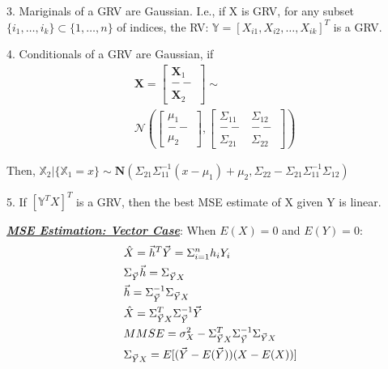 \documentclass[12pt]{article}
\newcommand{\bulletPoint}[1]{\ul{\textit{\textbf{#1}}}}
\begin{document}
\begin{multicols*}{4}
3. Mariginals of a GRV are Gaussian. I.e., if X is GRV, for any subset $\{i_1, \ldots, i_k\} \subset \{1, \ldots, n\}$ of indices, the RV: $\mathbb{Y}=[X_{i1}, X_{i2}, \ldots, X_{ik}]^T$ is a GRV.

4. Conditionals of a GRV are Gaussian, if
\useshortskip\begin{equation*}
\begin{split}
& \mathbf{X}=\left[\begin{array}{c}
\mathbf{X}_1 \\
-- \\
\mathbf{X}_2
\end{array}\right] \sim \\
& \mathcal{N}\left(\left[\begin{array}{c}
\mu_1 \\
-- \\
\mu_2
\end{array}\right],\left[\begin{array}{c|c}
\Sigma_{11} & \Sigma_{12} \\
-- & -- \\
\Sigma_{21} & \Sigma_{22}
\end{array}\right]\right)
\end{split}
\end{equation*}

Then,  $\mathbb{X}_2|\{\mathbb{X}_1=x\} \sim \mathbf{N}(\Sigma_{21}\Sigma^{-1}_{11}(x-\mu_1)+\mu_2, \Sigma_{22}-\Sigma_{21}\Sigma^{-1}_{11}\Sigma_{12})$

5. If $[\mathbb{Y}^T X]^T$ is a GRV, then the best MSE estimate of X given Y is linear.


\bulletPoint{MSE Estimation: Vector Case}:
When $E(X)=0$ and $E(Y)=0$:  
\useshortskip \begin{equation*}
    \begin{split}
        & \Hat{X} = \Vec{h}^T \Vec{Y} = \Sigma^n_{i=1}h_iY_i\\
        & \Sigma_{\Vec{Y}} \Vec{h} = \Sigma_{\Vec{Y}X} \\
        & \Vec{h} = \Sigma^{-1}_{\Vec{Y}}\Sigma_{\Vec{Y}X}\\
        & \Hat{X} = \Sigma^T_{\Vec{Y}X}\Sigma^{-1}_{\Vec{Y}} \Vec{Y}\\
        & MMSE = \sigma^2_X - \Sigma^T_{\Vec{Y}X}\Sigma^{-1}_{\Vec{Y}}\Sigma_{\Vec{Y}X}\\
        & \Sigma_{\Vec{Y}X} = E[(\Vec{Y}-E(\Vec{Y}))(X-E(X))]
    \end{split}
\end{equation*}



\end{multicols*}
\end{document}
